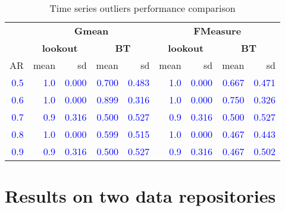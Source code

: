 \documentclass[
]{article}
\begin{document}
\begin{table}

\caption{\label{tab:timeseriesdatviz}Time series outliers performance comparison}
\centering
\begin{tabular}[t]{rrrrrrrrr}
\toprule
\multicolumn{1}{c}{\textbf{}} & \multicolumn{4}{c}{\textbf{Gmean}} & \multicolumn{4}{c}{\textbf{FMeasure}} \\
\cmidrule(l{3pt}r{3pt}){2-5} \cmidrule(l{3pt}r{3pt}){6-9}
\multicolumn{1}{c}{\textbf{}} & \multicolumn{2}{c}{\textbf{lookout}} & \multicolumn{2}{c}{\textbf{BT}} & \multicolumn{2}{c}{\textbf{lookout}} & \multicolumn{2}{c}{\textbf{BT}} \\
\cmidrule(l{3pt}r{3pt}){2-3} \cmidrule(l{3pt}r{3pt}){4-5} \cmidrule(l{3pt}r{3pt}){6-7} \cmidrule(l{3pt}r{3pt}){8-9}
AR & mean & sd & mean & sd & mean & sd & mean & sd\\
\midrule
\textcolor{blue}{0.5} & \textcolor{blue}{1.0} & \textcolor{blue}{0.000} & \textcolor{blue}{0.700} & \textcolor{blue}{0.483} & \textcolor{blue}{1.0} & \textcolor{blue}{0.000} & \textcolor{blue}{0.667} & \textcolor{blue}{0.471}\\
\textcolor{blue}{0.6} & \textcolor{blue}{1.0} & \textcolor{blue}{0.000} & \textcolor{blue}{0.899} & \textcolor{blue}{0.316} & \textcolor{blue}{1.0} & \textcolor{blue}{0.000} & \textcolor{blue}{0.750} & \textcolor{blue}{0.326}\\
\textcolor{blue}{0.7} & \textcolor{blue}{0.9} & \textcolor{blue}{0.316} & \textcolor{blue}{0.500} & \textcolor{blue}{0.527} & \textcolor{blue}{0.9} & \textcolor{blue}{0.316} & \textcolor{blue}{0.500} & \textcolor{blue}{0.527}\\
\textcolor{blue}{0.8} & \textcolor{blue}{1.0} & \textcolor{blue}{0.000} & \textcolor{blue}{0.599} & \textcolor{blue}{0.515} & \textcolor{blue}{1.0} & \textcolor{blue}{0.000} & \textcolor{blue}{0.467} & \textcolor{blue}{0.443}\\
\textcolor{blue}{0.9} & \textcolor{blue}{0.9} & \textcolor{blue}{0.316} & \textcolor{blue}{0.500} & \textcolor{blue}{0.527} & \textcolor{blue}{0.9} & \textcolor{blue}{0.316} & \textcolor{blue}{0.467} & \textcolor{blue}{0.502}\\
\bottomrule
\end{tabular}
\end{table}

\hypertarget{sec:applications}{%
\section{Results on two data repositories}\label{sec:applications}}
\end{document}
